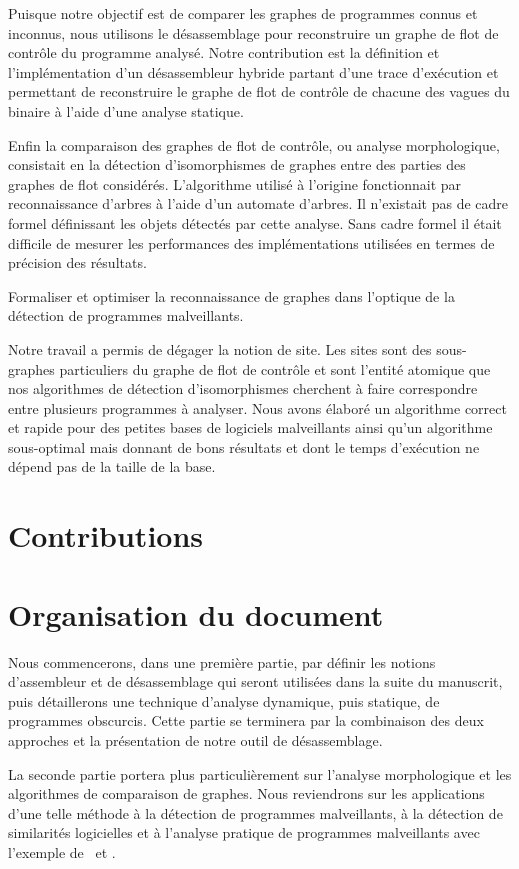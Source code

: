Puisque notre objectif est de comparer les graphes de programmes connus et inconnus, nous utilisons le désassemblage pour reconstruire un graphe de flot de contrôle du programme analysé.
Notre contribution est la définition et l'implémentation d'un désassembleur hybride partant d'une trace d'exécution et permettant de reconstruire le graphe de flot de contrôle de chacune des vagues du binaire à l'aide d'une analyse statique.

Enfin la comparaison des graphes de flot de contrôle, ou analyse morphologique, consistait en la détection d'isomorphismes de graphes entre des parties des graphes de flot considérés. 
L'algorithme utilisé à l'origine fonctionnait par reconnaissance d'arbres à l'aide d'un automate d'arbres. Il n'existait pas de cadre formel définissant les objets détectés par cette analyse. Sans cadre formel il était difficile de mesurer les performances des implémentations utilisées en termes de précision des résultats.

\begin{pbb}
 Formaliser et optimiser la reconnaissance de graphes dans l'optique de la détection de programmes malveillants.
\end{pbb}

Notre travail a permis de dégager la notion de site. Les sites sont des sous-graphes particuliers du graphe de flot de contrôle et sont l'entité atomique que nos algorithmes de détection d'isomorphismes cherchent à faire correspondre entre plusieurs programmes à analyser. Nous avons élaboré un algorithme correct et rapide pour des petites bases de logiciels malveillants ainsi qu'un algorithme sous-optimal mais donnant de bons résultats et dont le temps d'exécution ne dépend pas de la taille de la base.

\section*{Contributions}


\section*{Organisation du document}

Nous commencerons, dans une première partie, par définir les notions d'assembleur et de désassemblage qui seront utilisées dans la suite du manuscrit, puis détaillerons une technique d'analyse dynamique, puis statique, de programmes obscurcis. Cette partie se terminera par la combinaison des deux approches et la présentation de notre outil de désassemblage.

La seconde partie portera plus particulièrement sur l'analyse morphologique et les algorithmes de comparaison de graphes. Nous reviendrons sur les applications d'une telle méthode à la détection de programmes malveillants, à la détection de similarités logicielles et à l'analyse pratique de programmes malveillants avec l'exemple de \duqu\ et \stux.
